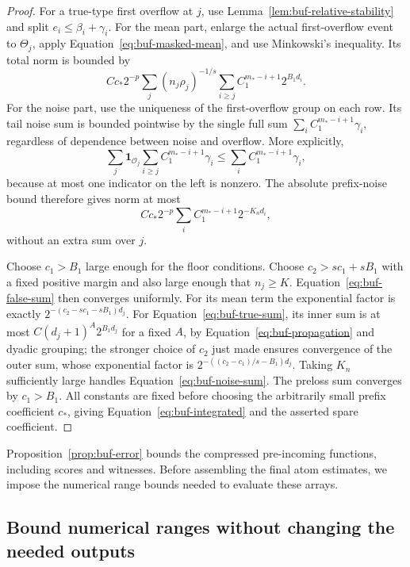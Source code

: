 \begin{proof}
For a true-type first overflow at $j$, use
Lemma~\ref{lem:buf-relative-stability} and split $e_i\leq\beta_i+\gamma_i$.
For the mean part, enlarge the actual first-overflow event to $\Theta_j$,
apply Equation~\eqref{eq:buf-masked-mean}, and use Minkowski's inequality.
Its total norm is bounded by
\begin{equation}
 Cc_*2^{-p}\sum_j(n_j\rho_j)^{-1/s}
       \sum_{i\geq j}C_1^{m_*-i+1}2^{B_1d_i}.
 \label{eq:buf-true-sum}
\end{equation}
For the noise part, use the uniqueness of the first-overflow group on
each row.  Its tail noise sum is bounded pointwise by the single full
sum $\sum_iC_1^{m_*-i+1}\gamma_i$, regardless of dependence between
noise and overflow.  More explicitly,
\[
 \sum_j\mathbf1_{\mathcal O_j}
       \sum_{i\geq j}C_1^{m_*-i+1}\gamma_i
 \leq\sum_i C_1^{m_*-i+1}\gamma_i,
\]
because at most one indicator on the left is nonzero.  The absolute
prefix-noise bound therefore gives
norm at most
\begin{equation}
 Cc_*2^{-p}\sum_iC_1^{m_*-i+1}2^{-K_nd_i},
 \label{eq:buf-noise-sum}
\end{equation}
without an extra sum over $j$.

Choose $c_1>B_1$ large enough for the floor conditions.  Choose
$c_2>sc_1+sB_1$ with a fixed positive margin and also large enough that
$n_j\geq K$.  Equation~\eqref{eq:buf-false-sum} then converges uniformly.
For its mean term the exponential factor is exactly
$2^{-(c_2-sc_1-sB_1)d_j}$.
For Equation~\eqref{eq:buf-true-sum}, its inner sum is at most
$C(d_j+1)^A2^{B_1d_j}$ for a fixed $A$, by
Equation~\eqref{eq:buf-propagation} and dyadic grouping; the stronger
choice of $c_2$ just made ensures convergence of the outer sum, whose
exponential factor is
$2^{-((c_2-c_1)/s-B_1)d_j}$.
Taking $K_n$ sufficiently large handles Equation~\eqref{eq:buf-noise-sum}.
The preloss sum converges by $c_1>B_1$.  All constants are fixed before
choosing the arbitrarily small prefix coefficient $c_*$, giving
Equation~\eqref{eq:buf-integrated} and the asserted spare coefficient.
\end{proof}

Proposition~\ref{prop:buf-error} bounds the compressed pre-incoming
functions, including scores and witnesses.  Before assembling the final
atom estimates, we impose the numerical range bounds needed to evaluate
these arrays.

\subsection{Bound numerical ranges without changing the needed outputs}

